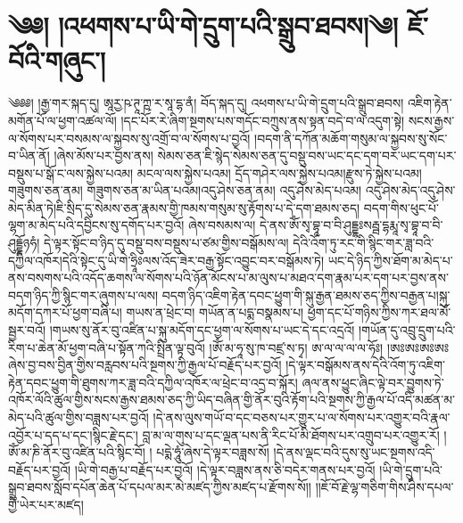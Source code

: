 \setcounter{footnote}{0} 
\chapter{༄༅། །འཕགས་པ་ཡི་གེ་དྲུག་པའི་སྒྲུབ་ཐབས།༄། ཇོ་བོའི་གཞུང་། }༄༅༅། །རྒྱ་གར་སྐད་དུ། ཨཱརྱ་ཥ་ཊཱ་ཀྵ་ར་སཱ་དྷ་ནཾ། བོད་སྐད་དུ། འཕགས་པ་ཡི་གེ་དྲུག་པའི་སྒྲུབ་ཐབས། འཇིག་རྟེན་མགོན་པོ་ལ་ཕྱག་འཚལ་ལོ། །དང་པོར་རེ་ཞིག་སྔགས་པས་གདོང་བཀྲུས་ནས་སྟན་བདེ་བ་ལ་འདུག་སྟེ། སངས་རྒྱས་ལ་སོགས་པར་བསམས་ལ་སྐྱབས་སུ་འགྲོ་བ་ལ་སོགས་པ་བྱའོ། །བདག་ནི་དཀོན་མཆོག་གསུམ་ལ་སྐྱབས་སུ་སོང་བ་ཡིན་ནོ། །ཞེས་མོས་པར་བྱས་ནས། སེམས་ཅན་ཇི་སྙེད་སེམས་ཅན་དུ་བསྡུ་བས་ཡང་དང་དག་བར་ཡང་དག་པར་བསྡུས་པ་སྒོ་ང་ལས་སྐྱེས་པའམ། མངལ་ལས་སྐྱེས་པའམ། དྲོད་གཤེར་ལས་སྐྱེས་པའམ།རྫུས་ཏེ་སྐྱེས་པའམ། གཟུགས་ཅན་ནམ། གཟུགས་ཅན་མ་ཡིན་པའམ།འདུ་ཤེས་ཅན་ནམ། འདུ་ཤེས་མེད་པའམ། འདུ་ཤེས་མེད་འདུ་ཤེས་མེད་མིན་ཏེ།ཇི་སྲིད་དུ་སེམས་ཅན་རྣམས་གྱི་ཁམས་གསུམ་སུ་རྟོགས་པ་དེ་དག་ཐམས་ཅད། བདག་གིས་ཕུང་པོ་ལྷག་མ་མེད་པའི་དབྱིངས་སུ་དགོད་པར་བྱའོ། ཞེས་བསམས་ལ། དེ་ནས་ཨོཾ་སྭ་བྷཱ་བ་བི་ཤུདྡྷཿསརྦྦ་དྷརྨཱ་སྭ་བྷཱ་བ་བི་ཤུདྡྷོཉཧཾ། དེ་ལྟར་སྟོང་བ་ཉིད་དུ་བསྡུ་བས་བསྡུས་པ་ཙམ་གྱིས་བསྒོམས་ལ། དེའི་འོག་ཏུ་རང་གི་སྙིང་གར་ཟླ་བའི་དཀྱིལ་འཁོར།དེའི་སྟེང་དུ་ཡི་གེ་ཧྲཱིཿལས་འོད་ཟེར་བརྒྱ་སྟོང་འབྱུང་བར་བསྒོམས་ཏེ། ཡང་དེ་ཉིད་ཀྱིས་ཐོག་མ་མེད་པ་ནས་བསགས་པའི་འདོད་ཆགས་ལ་སོགས་པའི་ཉོན་མོངས་པ་མ་ལུས་པ་མཐའ་དག་རྣམ་པར་དག་པར་བྱས་ནས་བདག་ཉིད་ཀྱི་སྙིང་གར་ཞུགས་པ་ལས། བདག་ཉིད་འཇིག་རྟེན་དབང་ཕྱུག་གི་སྐུ་རྒྱན་ཐམས་ཅད་ཀྱིས་བརྒྱན་པ།སྐུ་མདོག་དཀར་པོ་ཕྱག་བཞི་པ། གཡས་ན་ཕྲེང་བ། གཡོན་ན་པདྨ་བསྣམས་པ། ཕྱག་དང་པོ་གཉིས་ཀྱིས་ཀར་ཐལ་མོ་སྦྱར་བའོ། །གཡས་སུ་ནོར་བུ་འཛིན་པ་སྐུ་མདོག་དང་ཕྱག་ལ་སོགས་པ་ཡང་དེ་དང་འདྲའོ། །གཡོན་དུ་འབྲུ་དྲུག་པའི་རིག་པ་ཆེན་མོ་ཕྱག་བཞི་པ་སྟོན་ཀའི་སྤྲིན་ལྟ་བུའོ། །ཨོཾ་མ་ཧཱ་སུ་ཁ་བཛྲ་ས་ཏྭ། ཨ་ལ་ལ་ལ་ལ་ཧོཿ། །ཨཿཨཿཨཿཨཿཞེས་བྱ་བས་བྱིན་གྱིས་བརླབས་པའི་སྔགས་ཀྱི་རྒྱལ་པོ་བརྗོད་པར་བྱའོ། །དེ་ལྟར་བསྒོམས་ནས་དེའི་འོག་ཏུ་འཇིག་རྟེན་དབང་ཕྱུག་གི་ཐུགས་ཀར་ཟླ་བའི་དཀྱིལ་འཁོར་ལ་ཕྲེང་བ་འདྲ་བ་སྐོར། ཞལ་ནས་ཕྱུང་ཞིང་ལྟེ་བར་བྱུགས་ཏེ་འཁོར་ལོའི་ཚུལ་གྱིས་སངས་རྒྱས་ཐམས་ཅད་ཀྱི་ཡིད་བཞིན་གྱི་ནོར་བུའི་རྟོག་པའི་སྔགས་ཀྱི་རྒྱལ་པོ་འདི་མཚན་མ་མེད་པའི་ཚུལ་གྱིས་བཟླས་པར་བྱའོ། །དེ་ནས་ལུས་གཡོ་བ་དང་བཅས་པར་གྱུར་པ་ལ་སོགས་པར་འགྱུར་བའི་རྣལ་འབྱོར་པ་དད་པ་དང་།སྙིང་རྗེ་དང་། བླ་མ་ལ་གུས་པ་དང་ལྡན་པས་ནི་རིང་པོ་མི་ཐོགས་པར་འགྲུབ་པར་འགྱུར་རོ། །ཨོཾ་མ་ཎི་ནོར་བུ་འཛིན་པའི་སྙིང་བོ། ། པདྨེ་ཧཱུཾ་ཞེས་དེ་ལྟར་བཟླས་སོ། །དེ་ནས་ལྡང་བའི་དུས་སུ་ཡང་སྔགས་འདི་བརྗོད་པར་བྱའོ། །ཡི་གེ་བརྒྱ་པ་བརྗོད་པར་བྱའོ། །དེ་ལྟར་བཟླས་ནས་ཅི་བདེར་གནས་པར་བྱའོ། །ཡི་གེ་དྲུག་པའི་སྒྲུབ་ཐབས་སློབ་དཔོན་ཆེན་པོ་དཔལ་མར་མེ་མཛད་ཀྱིས་མཛད་པ་རྫོགས་སོ།། །།ཇོ་བོ་རྗེ་ལྷ་གཅིག་གིས་ཤིས་དཔལ་གྱི་ཡེར་པར་མཛད། 